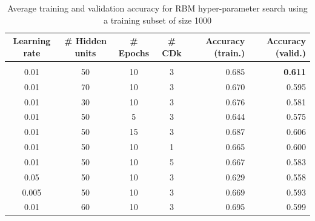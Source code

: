\documentclass{article} %
\begin{document}
\begin{table}[h]
\caption{Average training and validation accuracy for RBM hyper-parameter
 search using a training subset of size 1000}
\label{results-table}
\begin{center}
\begin{adjustbox}{width=1\textwidth}
\begin{tabular}{cccc|rr}

\multicolumn{1}{c}{\bf Learning rate}  
&\multicolumn{1}{c}{\bf \# Hidden units}  
&\multicolumn{1}{c}{\bf \# Epochs} 
&\multicolumn{1}{c}{\bf \# CDk} 
&\multicolumn{1}{|r}{\bf Accuracy (train.)}
&\multicolumn{1}{r}{\bf Accuracy (valid.)}
\\ \hline \\	
0.01 & 50 & 10 & 3 & 0.685 & \textbf{0.611} \\
0.01 & 70 & 10 & 3 & 0.670 & 0.595 \\
0.01 & 30 & 10 & 3 & 0.676 & 0.581 \\
0.01 & 50 & 5 & 3 & 0.644 & 0.575 \\
0.01 & 50 & 15 & 3 & 0.687 & 0.606 \\
0.01 & 50 & 10 & 1 & 0.665 & 0.600 \\
0.01 & 50 & 10 & 5 & 0.667 & 0.583 \\
0.05 & 50 & 10 & 3 & 0.629 & 0.558 \\
0.005 & 50 & 10 & 3 & 0.669 & 0.593 \\
0.01 & 60 & 10 & 3 & 0.695 & 0.599 \\

\end{tabular}
\end{adjustbox}
\end{center}
\end{table}
\end{document}
